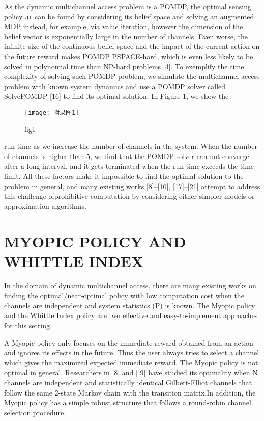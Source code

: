 As the dynamic multichannel access problem is a POMDP, the optimal sensing policy π∗ can be found by considering its belief space and solving an augmented MDP instead, for example, via value iteration, however the dimension of the belief vector is exponentially large in the number of channels. Even worse, the inﬁnite size of the continuous belief space and the impact of the current action on the future reward makes POMDP PSPACE-hard, which is even less likely to be solved in polynomial time than NP-hard problems [4]. To exemplify the time complexity of solving such POMDP problem, we simulate the multichannel access problem with known system dynamics and use a POMDP solver called SolvePOMDP [16] to ﬁnd its optimal solution. In Figure 1, we show the
\begin{figure}[h]
	\centering
	\texttt{[image: 附录图1]}
	\caption{fig1}
\end{figure}

 run-time as we increase the number of channels in the system. When the number of channels is higher than 5, we ﬁnd that the POMDP solver can not converge after a long interval, and it gets terminated when the run-time exceeds the time limit. All these factors make it impossible to ﬁnd the optimal solution to the problem in general, and many existing works [8]–[10], [17]–[21] attempt to address this challenge ofprohibitive computation by considering either simpler models or approximation algorithms.

\section{  MYOPIC POLICY AND WHITTLE INDEX   }
In the domain of dynamic multichannel access, there are many existing works on ﬁnding the optimal/near-optimal policy with low computation cost when the channels are independent and system statistics (P) is known. The Myopic policy and the Whittle Index policy are two effective and easy-to-implement approaches for this setting.

A Myopic policy only focuses on the immediate reward obtained from an action and ignores its effects in the future. Thus the user always tries to select a channel which gives the maximized expected immediate reward. The Myopic policy is not optimal in general. Researchers in [8] and [ 9] have studied its optimality when N channels are independent and statistically identical Gilbert-Elliot channels that follow the same 2-state Markov chain with the transition matrix.In addition, the Myopic policy has a simple robust structure that follows a round-robin channel selection procedure.

